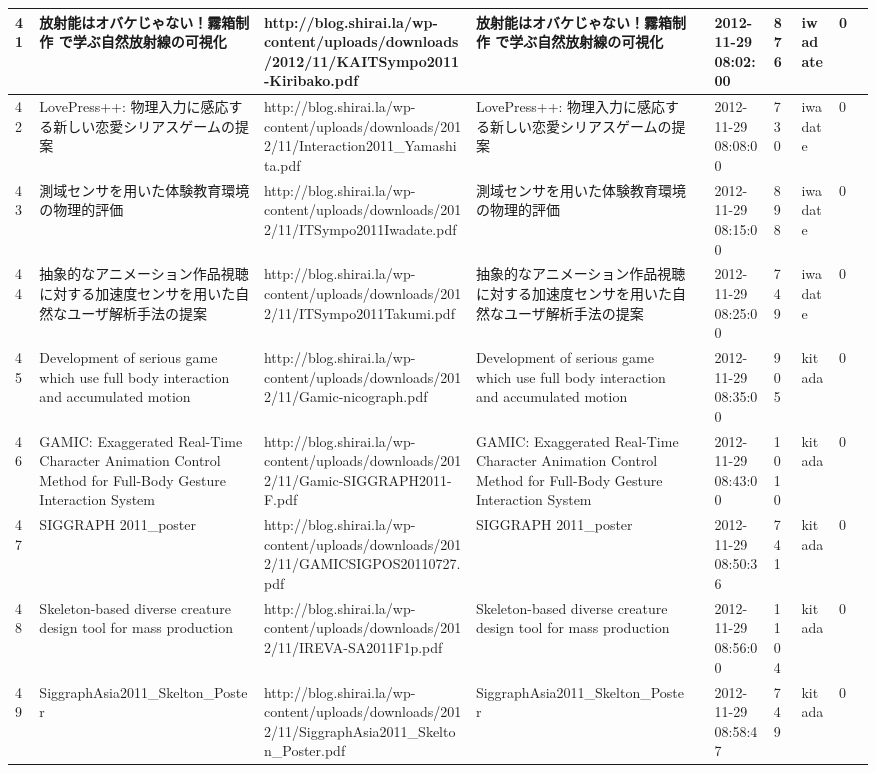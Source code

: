\begin{longtable}{|l|l|l|l|l|l|l|l|l|l|}
41 & 放射能はオバケじゃない！霧箱制作 で学ぶ自然放射線の可視化 & http://blog.shirai.la/wp-content/uploads/downloads/2012/11/KAITSympo2011-Kiribako.pdf & 放射能はオバケじゃない！霧箱制作 で学ぶ自然放射線の可視化 &  & 2012-11-29 08:02:00 & 876 & iwadate & 0 &  \\ \hline 
42 & LovePress++: 物理入力に感応する新しい恋愛シリアスゲームの提案 & http://blog.shirai.la/wp-content/uploads/downloads/2012/11/Interaction2011\_Yamashita.pdf & LovePress++: 物理入力に感応する新しい恋愛シリアスゲームの提案 &  & 2012-11-29 08:08:00 & 730 & iwadate & 0 &  \\ \hline 
43 & 測域センサを用いた体験教育環境の物理的評価 & http://blog.shirai.la/wp-content/uploads/downloads/2012/11/ITSympo2011Iwadate.pdf & 測域センサを用いた体験教育環境の物理的評価 &  & 2012-11-29 08:15:00 & 898 & iwadate & 0 &  \\ \hline 
44 & 抽象的なアニメーション作品視聴に対する加速度センサを用いた自然なユーザ解析手法の提案 & http://blog.shirai.la/wp-content/uploads/downloads/2012/11/ITSympo2011Takumi.pdf & 抽象的なアニメーション作品視聴に対する加速度センサを用いた自然なユーザ解析手法の提案 &  & 2012-11-29 08:25:00 & 749 & iwadate & 0 &  \\ \hline 
45 & Development of serious game which use full body interaction and accumulated motion & http://blog.shirai.la/wp-content/uploads/downloads/2012/11/Gamic-nicograph.pdf & Development of serious game which use full body interaction and accumulated motion &  & 2012-11-29 08:35:00 & 905 & kitada & 0 &  \\ \hline 
46 & GAMIC: Exaggerated Real-Time Character Animation Control Method for Full-Body Gesture Interaction System & http://blog.shirai.la/wp-content/uploads/downloads/2012/11/Gamic-SIGGRAPH2011-F.pdf & GAMIC: Exaggerated Real-Time Character Animation Control Method for Full-Body Gesture Interaction System &  & 2012-11-29 08:43:00 & 1010 & kitada & 0 &  \\ \hline 
47 & SIGGRAPH 2011\_poster & http://blog.shirai.la/wp-content/uploads/downloads/2012/11/GAMICSIGPOS20110727.pdf & SIGGRAPH 2011\_poster &  & 2012-11-29 08:50:36 & 741 & kitada & 0 &  \\ \hline 
48 & Skeleton-based diverse creature design tool for mass production & http://blog.shirai.la/wp-content/uploads/downloads/2012/11/IREVA-SA2011F1p.pdf & Skeleton-based diverse creature design tool for mass production &  & 2012-11-29 08:56:00 & 1104 & kitada & 0 &  \\ \hline 
49 & SiggraphAsia2011\_Skelton\_Poster & http://blog.shirai.la/wp-content/uploads/downloads/2012/11/SiggraphAsia2011\_Skelton\_Poster.pdf & SiggraphAsia2011\_Skelton\_Poster &  & 2012-11-29 08:58:47 & 749 & kitada & 0 &  \\ \hline 

\end{longtable}
